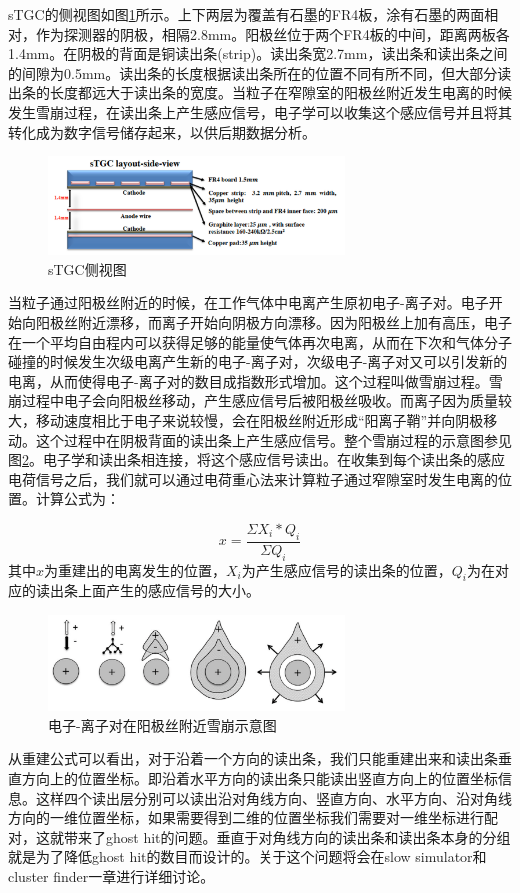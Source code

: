 sTGC的侧视图如图\ref{fig:sTGC_sideview}所示。上下两层为覆盖有石墨的FR4板，涂有石墨的两面相对，作为探测器的阴极，相隔2.8mm。阳极丝位于两个FR4板的中间，距离两板各1.4mm。在阴极的背面是铜读出条(strip)。读出条宽2.7mm，读出条和读出条之间的间隙为0.5mm。读出条的长度根据读出条所在的位置不同有所不同，但大部分读出条的长度都远大于读出条的宽度。当粒子在窄隙室的阳极丝附近发生电离的时候发生雪崩过程，在读出条上产生感应信号，电子学可以收集这个感应信号并且将其转化成为数字信号储存起来，以供后期数据分析。
\begin{figure}[htb]
    \begin{center}
    \includegraphics[width=0.7\textwidth,clip]{figures/Chapter3/sTGC_side_view.png}
    \end{center}
    \caption[sTGC侧视图]{sTGC侧视图}
    \label{fig:sTGC_sideview}
\end{figure}

当粒子通过阳极丝附近的时候，在工作气体中电离产生原初电子-离子对。电子开始向阳极丝附近漂移，而离子开始向阴极方向漂移。因为阳极丝上加有高压，电子在一个平均自由程内可以获得足够的能量使气体再次电离，从而在下次和气体分子碰撞的时候发生次级电离产生新的电子-离子对，次级电子-离子对又可以引发新的电离，从而使得电子-离子对的数目成指数形式增加。这个过程叫做雪崩过程。雪崩过程中电子会向阳极丝移动，产生感应信号后被阳极丝吸收。而离子因为质量较大，移动速度相比于电子来说较慢，会在阳极丝附近形成“阳离子鞘”并向阴极移动。这个过程中在阴极背面的读出条上产生感应信号。整个雪崩过程的示意图参见图\ref{fig:Avalanche}。电子学和读出条相连接，将这个感应信号读出。在收集到每个读出条的感应电荷信号之后，我们就可以通过电荷重心法来计算粒子通过窄隙室时发生电离的位置。计算公式为：

\begin{equation}
    \label{eq:center_of_gravity}
    x = \frac{\Sigma X_i*Q_i}{\Sigma Q_i} 
\end{equation}
其中$x$为重建出的电离发生的位置，$X_i$为产生感应信号的读出条的位置，$Q_i$为在对应的读出条上面产生的感应信号的大小。

\begin{figure}[htb]
    \begin{center}
    \includegraphics[width=0.7\textwidth,clip]{figures/Chapter3/Avalanche.png}
    \end{center}
    \caption[电子-离子对在阳极丝附近雪崩示意图]{电子-离子对在阳极丝附近雪崩示意图}
    \label{fig:Avalanche}
\end{figure}

从重建公式可以看出，对于沿着一个方向的读出条，我们只能重建出来和读出条垂直方向上的位置坐标。即沿着水平方向的读出条只能读出竖直方向上的位置坐标信息。这样四个读出层分别可以读出沿对角线方向、竖直方向、水平方向、沿对角线方向的一维位置坐标，如果需要得到二维的位置坐标我们需要对一维坐标进行配对，这就带来了ghost hit的问题。垂直于对角线方向的读出条和读出条本身的分组就是为了降低ghost hit的数目而设计的。关于这个问题将会在slow simulator和cluster finder一章进行详细讨论。